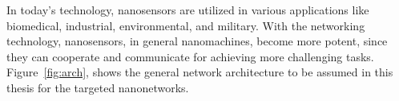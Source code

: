 \documentclass[12pt, oneandhalf, chaparabic, sees, ms]{metu}
\begin{document}
% 
%














% 
% 
% 
%  
% 
%  
%   
% 
% 
%  
% 
% 
%  
% 
%
% 



%
%

\newpage

In today's technology, nanosensors are utilized in various applications like biomedical, industrial, environmental, and military. 
With the networking technology, nanosensors, in general nanomachines, become more potent, since they can cooperate and 
communicate for achieving more challenging tasks. Figure~\ref{fig:arch}, shows the general network architecture to 
be assumed in this thesis for the targeted nanonetworks. 
\end{document}
